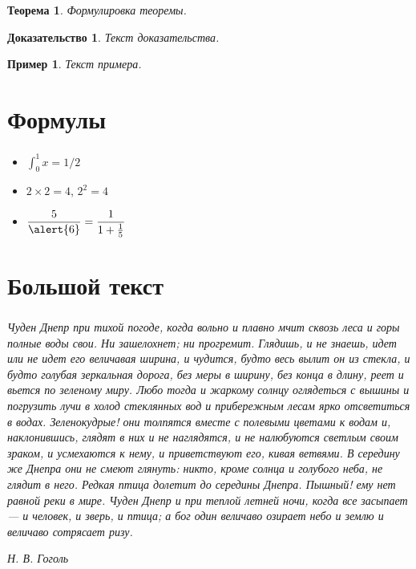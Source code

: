 \documentclass[t, aspectratio=169, handout]{beamer}  %
\newtheorem{rtheorem}{Теорема}
\newtheorem{rproof}{Доказательство}
\newtheorem{rexample}{Пример}
\begin{document}
	\begin{frame}
		\frametitle{\insertsection}
		\framesubtitle{\insertsubsection}
		\begin{rtheorem}
			Формулировка теоремы.    
		\end{rtheorem}
		\begin{rproof}
			Текст доказательства.
		\end{rproof}
		\begin{rexample}
			Текст примера.
		\end{rexample}
	\end{frame}
	
	\section{Формулы}
	
	\begin{frame}
		\frametitle{\insertsection}
		\begin{itemize}
			\item $\displaystyle\int_0^1 x=1/2$  
			\item $2\times 2=4$, $2^2=4$ 
			\item $\displaystyle\frac{5}{\alert{6}}=\frac{1}{1+\frac{1}{5}}$ 
		\end{itemize}
	\end{frame}
	
	\section{Большой текст}
	
	\begin{frame}[shrink=7]\label{lab}  %
		\frametitle{\insertsection}
		\textsl{Чуден Днепр при тихой погоде, когда вольно и плавно мчит сквозь леса и горы полные воды свои. Ни зашелохнет; ни прогремит. Глядишь, и не знаешь, идет или не идет его величавая ширина, и чудится, будто весь вылит он из стекла, и будто голубая зеркальная дорога, без меры в ширину, без конца в длину, реет и вьется по зеленому миру. Любо тогда и жаркому солнцу оглядеться с вышины и погрузить лучи в холод стеклянных вод и прибережным лесам ярко отсветиться в водах. Зеленокудрые! они толпятся вместе с полевыми цветами к водам и, наклонившись, глядят в них и не наглядятся, и не налюбуются светлым  своим зраком, и усмехаются к нему, и приветствуют его, кивая ветвями. В середину же Днепра они не смеют глянуть: никто, кроме солнца и голубого неба, не глядит в него. Редкая птица долетит до середины Днепра. Пышный! ему нет равной реки в мире. Чуден Днепр и при теплой летней ночи, когда все засыпает --- и человек, и зверь, и птица; а бог один величаво озирает небо и землю и величаво сотрясает ризу.}
		
		\hfill{\textit{Н. В. Гоголь}}
	\end{frame}
	
\end{document}
